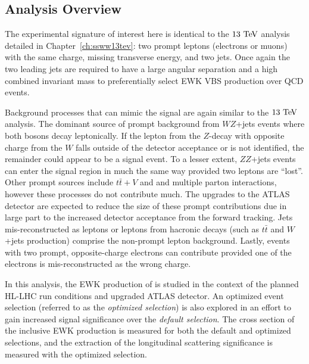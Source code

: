 \subsection{Analysis Overview}
The experimental signature of interest here is identical to the $13\tev$ analysis detailed in Chapter~\ref{ch:ssww13tev}: two prompt leptons (electrons or muons) with the same charge, missing transverse energy, and two jets.
Once again the two leading jets are required to have a large angular separation and a high combined invariant mass to preferentially select EWK VBS production over QCD \ssww events.

Background processes that can mimic the signal are again similar to the $13\tev$ analysis. %
The dominant source of prompt background from $WZ$+jets events where both bosons decay leptonically.  
If the lepton from the $Z$-decay with opposite charge from the $W$ falls outside of the detector acceptance or is not identified, the remainder could appear to be a \ssww signal event.
To a lesser extent, $ZZ$+jets events can enter the signal region in much the same way provided two leptons are ``lost''.
Other prompt sources include $t\bar{t}+V$ and and multiple parton interactions, however these processes do not contribute much.
The upgrades to the ATLAS detector are expected to reduce the size of these prompt contributions due in large part to the increased detector acceptance from the forward tracking.
Jets mis-reconstructed as leptons or leptons from hacronic decays (such as $t\bar{t}$ and $W$+jets production) comprise the non-prompt lepton background.
Lastly, events with two prompt, opposite-charge electrons can contribute provided one of the electrons is mis-reconstructed as the wrong charge.

In this analysis, the EWK production of \ssww is studied in the context of the planned HL-LHC run conditions and upgraded ATLAS detector.
An optimized event selection (referred to as the \emph{optimized selection}) is also explored in an effort to gain increased signal significance over the \emph{default selection}.
The cross section of the inclusive EWK production is measured for both the default and optimized selections, and the extraction of the longitudinal scattering significance is measured with the optimized selection.
